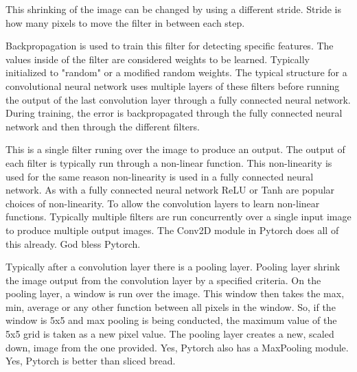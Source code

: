 \documentclass{article}
\begin{document}
\vspace{3mm}

\noindent This shrinking of the image can be changed by using a different stride.
Stride is how many pixels to move the filter in between each step.

\vspace{3mm}

\noindent Backpropagation is used to train this filter for detecting specific features.
The values inside of the filter are considered weights to be learned.
Typically initialized to "random" or a modified random weights.
The typical structure for a convolutional neural network uses multiple layers of these filters before running the output of the last convolution layer through a fully connected neural network.
During training, the error is backpropagated through the fully connected neural network and then through the different filters.

\vspace{3mm}

\noindent This is a single filter runing over the image to produce an output.
The output of each filter is typically run through a non-linear function.
This non-linearity is used for the same reason non-linearity is used in a fully connected neural network.
As with a fully connected neural network ReLU or Tanh are popular choices of non-linearity.
To allow the convolution layers to learn non-linear functions.
Typically multiple filters are run concurrently over a single input image to produce multiple output images.
The Conv2D module in Pytorch does all of this already.
God bless Pytorch.

\vspace{3mm}

\noindent Typically after a convolution layer there is a pooling layer.
Pooling layer shrink the image output from the convolution layer by a specified criteria.
On the pooling layer, a window is run over the image.
This window then takes the max, min, average or any other function between all pixels in the window.
So, if the window is 5x5 and max pooling is being conducted, the maximum value of the 5x5 grid is taken as a new pixel value.
The pooling layer creates a new, scaled down, image from the one provided.
Yes, Pytorch also has a MaxPooling module.
Yes, Pytorch is better than sliced bread.

\vspace{3mm}
\end{document}
